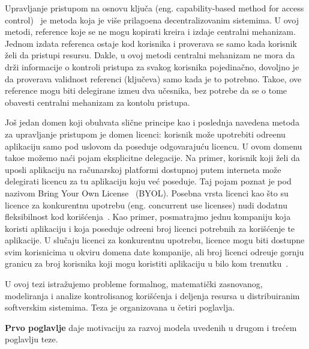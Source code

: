 Upravljanje pristupom na osnovu klju\v ca (eng. capability-based method for access control)~\cite{zhao2013behavioural} je metoda koja je vi\v se prilago\dj ena decentralizovanim sistemima. U ovoj metodi, 
reference koje se ne mogu kopirati kreira i izdaje centralni mehanizam. Jednom izdata referenca ostaje kod korisnika i proverava se samo kada korisnik \v zeli da pristupi resursu. Dakle, u ovoj metodi centralni mehanizam ne mora da dr\v zi informacije o kontroli pristupa za svakog korisnika pojedina\v cno, dovoljno je da proverava validnost referenci (klju\v ceva) samo kada  je to potrebno. Tako\dj e, ove reference mogu biti delegirane izme\dj u dva u\v cesnika, bez potrebe da se o tome obavesti centralni mehanizam za kontolu pristupa. 
 
Jo\v s jedan domen koji obuhvata sli\v cne principe kao i poslednja navedena metoda za upravljanje pristupom je domen licenci: korisnik mo\v ze upotrebiti odre\dj enu aplikaciju samo pod uslovom da poseduje odgovaraju\' cu licencu. U ovom domenu tako\dj e mo\v zemo na\' ci pojam eksplicitne delegacije. Na primer, korisnik koji \v zeli da uposli aplikaciju na ra\v cunarskoj platformi dostupnoj putem interneta mo\v ze delegirati licencu za tu aplikaciju  koju ve\' c poseduje. Taj pojam poznat je pod nazivom Bring Your Own License~\cite{byol} (BYOL). 
Posebna vrsta licenci kao \v sto su licence za konkurentnu upotrebu (eng. concurrent use licenses) nudi dodatnu fleksibilnost kod kori\v s\' cenja~\cite{baratti2003license}. 
Kao primer, posmatrajmo jednu kompaniju koja koristi aplikaciju i koja poseduje odre\dj eni broj licenci potrebnih za kori\v s\' cenje te aplikacije. U slu\v caju licenci za konkurentnu upotrebu, licence mogu biti dostupne svim korisnicima u okviru domena date kompanije, ali broj licenci odre\dj uje gornju granicu za broj korisnika koji mogu koristiti aplikaciju u bilo kom trenutku~\cite{license_lp_comp}.

U ovoj tezi istra\v zujemo probleme formalnog, matemati\v cki zasnovanog, modeliranja i analize kontrolisanog kori\v s\' cenja i deljenja resursa u distribuiranim softverskim sistemima. Teza je organizovana u \v cetiri poglavlja.  

{\bf Prvo poglavlje} daje motivaciju za razvoj modela uvedenih u drugom i tre\' cem poglavlju teze.






